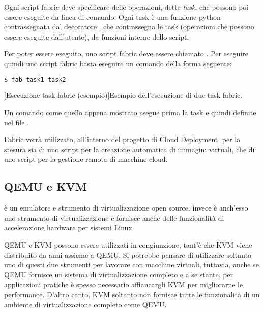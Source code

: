             Ogni script fabric deve specificare delle operazioni, dette \textit{task}, che possono poi essere eseguite da linea di comando. Ogni task è una funzione python contrassegnata dal decoratore , che contrassegna le task (operazioni che possono essere eseguite dall'utente), da funzioni interne dello script.
            
            Per poter essere eseguito, uno script fabric deve essere chiamato . Per eseguire quindi uno script fabric basta eseguire un comando della forma seguente:
            
            \begin{center}
                \begin{lstlisting}[language=bash, gobble=18]
                    $ fab task1 task2
                \end{lstlisting}
                \captionsetup{textformat=empty,labelformat=empty} \vspace{-2em}
                [Esecuzione task fabric (esempio)]{Esempio dell'esecuzione di due task fabric.}
            \end{center}
            
            Un comando come quello appena mostrato esegue prima la task  e quindi  definite nel file .
            
            Fabric verrà utilizzato, all'interno del progetto di Cloud Deployment, per la stesura sia di uno script per la creazione automatica di immagini virtuali, che di uno script per la gestione remota di macchine cloud.
        
        \subsection{QEMU e KVM} \label{subsec:p;sl;qemu_kvm}
        
             è un emulatore e strumento di virtualizzazione open source.  invece è anch'esso uno strumento di virtualizzazione e fornisce anche delle funzionalità di accelerazione hardware per sistemi Linux.
            
            \ac{QEMU} e \ac{KVM} possono essere utilizzati in congiunzione, tant'è che \ac{KVM} viene distribuito da anni assieme a \ac{QEMU}. Si potrebbe pensare di utilizzare soltanto uno di questi due strumenti per lavorare con macchine virtuali, tuttavia, anche se \ac{QEMU} fornisce un sistema di virtualizzazione completo e a se stante, per applicazioni pratiche è spesso necessario affiancargli \ac{KVM} per migliorarne le performance. D'altro canto, \ac{KVM} soltanto non fornisce tutte le funzionalità di un ambiente di virtualizzazione completo come \ac{QEMU}.
            
